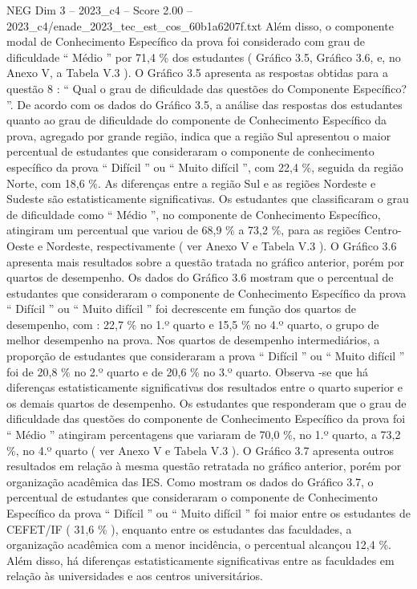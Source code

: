 \begin{textsample}{NEG Dim 3 – 2023\_c4 – Score 2.00 – 2023\_c4/enade\_2023\_tec\_est\_cos\_60b1a6207f.txt}
Além disso, o componente modal de Conhecimento Específico da prova foi considerado com grau de dificuldade “ Médio ” por 71,4 \% dos estudantes ( Gráfico 3.5, Gráfico 3.6, e, no Anexo V, a Tabela V.3 ).
O Gráfico 3.5 apresenta as respostas obtidas para a questão 8 : “ Qual o grau de dificuldade das questões do Componente Específico? ”.
De acordo com os dados do Gráfico 3.5, a análise das respostas dos estudantes quanto ao grau de dificuldade do componente de Conhecimento Específico da prova, agregado por grande região, indica que a região Sul apresentou o maior percentual de estudantes que consideraram o componente de conhecimento específico da prova “ Difícil ” ou “ Muito difícil ”, com 22,4 \%, seguida da região Norte, com 18,6 \%.
As diferenças entre a região Sul e as regiões Nordeste e Sudeste são estatisticamente significativas.
Os estudantes que classificaram o grau de dificuldade como “ Médio ”, no componente de Conhecimento Específico, atingiram um percentual que variou de 68,9 \% a 73,2 \%, para as regiões Centro-Oeste e Nordeste, respectivamente ( ver Anexo V e Tabela V.3 ).
O Gráfico 3.6 apresenta mais resultados sobre a questão tratada no gráfico anterior, porém por quartos de desempenho.
Os dados do Gráfico 3.6 mostram que o percentual de estudantes que consideraram o componente de Conhecimento Específico da prova “ Difícil ” ou “ Muito difícil ” foi decrescente em função dos quartos de desempenho, com : 22,7 \% no 1.º quarto e 15,5 \% no 4.º quarto, o grupo de melhor desempenho na prova.
Nos quartos de desempenho intermediários, a proporção de estudantes que consideraram a prova “ Difícil ” ou “ Muito difícil ” foi de 20,8 \% no 2.º quarto e de 20,6 \% no 3.º quarto.
Observa -se que há diferenças estatisticamente significativas dos resultados entre o quarto superior e os demais quartos de desempenho.
Os estudantes que responderam que o grau de dificuldade das questões do componente de Conhecimento Específico da prova foi “ Médio ” atingiram percentagens que variaram de 70,0 \%, no 1.º quarto, a 73,2 \%, no 4.º quarto ( ver Anexo V e Tabela V.3 ).
O Gráfico 3.7 apresenta outros resultados em relação à mesma questão retratada no gráfico anterior, porém por organização acadêmica das IES.
Como mostram os dados do Gráfico 3.7, o percentual de estudantes que consideraram o componente de Conhecimento Específico da prova “ Difícil ” ou “ Muito difícil ” foi maior entre os estudantes de CEFET/IF ( 31,6 \% ), enquanto entre os estudantes das faculdades, a organização acadêmica com a menor incidência, o percentual alcançou 12,4 \%.
Além disso, há diferenças estatisticamente significativas entre as faculdades em relação às universidades e aos centros universitários.

\end{textsample}
